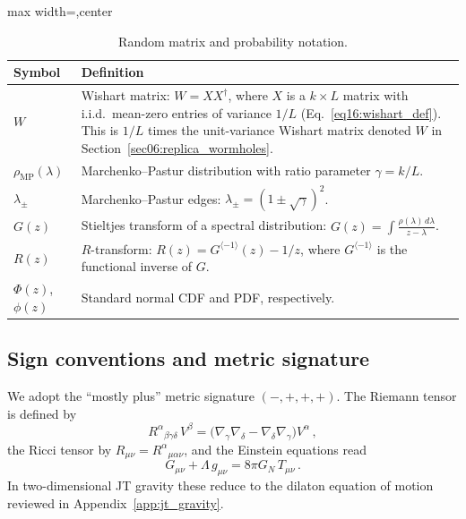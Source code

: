 \documentclass[11pt,letterpaper]{article}
\theoremstyle{plain}
\theoremstyle{definition}
\theoremstyle{remark}
\begin{document}
\begin{table}[ht]
\centering
\renewcommand{\arraystretch}{1.35}
\begin{adjustbox}{max width=\textwidth,center}
\begin{tabular}{@{}lp{10.6cm}@{}}
\hline
\textbf{Symbol} & \textbf{Definition} \\
\hline
$W$ &
  Wishart matrix: $W = X X^{\dagger}$, where $X$ is a $k \times L$ matrix
  with i.i.d.\ mean-zero entries of variance $1/L$
  (Eq.~\eqref{eq16:wishart_def}). This is $1/L$ times the unit-variance
  Wishart matrix denoted $W$ in Section~\ref{sec06:replica_wormholes}. \\
$\rho_{\mathrm{MP}}(\lambda)$ &
  Marchenko--Pastur distribution with ratio parameter $\gamma = k/L$. \\
$\lambda_{\pm}$ &
  Marchenko--Pastur edges: $\lambda_{\pm} = (1 \pm \sqrt{\gamma})^{2}$. \\
$G(z)$ &
  Stieltjes transform of a spectral distribution:
  $G(z) = \int \frac{\rho(\lambda)\,d\lambda}{z - \lambda}$. \\
$R(z)$ &
  $R$-transform: $R(z) = G^{\langle -1\rangle}(z) - 1/z$, where
  $G^{\langle -1\rangle}$ is the functional inverse of $G$. \\
$\Phi(z)$, $\phi(z)$ &
  Standard normal CDF and PDF, respectively. \\
\hline
\end{tabular}
\end{adjustbox}
\caption{Random matrix and probability notation.}
\label{tab16:rmt_notation}
\end{table}

\subsection{Sign conventions and metric signature}

We adopt the ``mostly plus'' metric signature $(-,+,+,+)$.  The Riemann tensor
is defined by
\begin{equation}
  R^{\alpha}{}_{\beta\gamma\delta}\, V^{\beta}
  = \bigl(\nabla_{\gamma}\nabla_{\delta}
  - \nabla_{\delta}\nabla_{\gamma}\bigr) V^{\alpha}\,,
  \label{eq16:riemann_convention}
\end{equation}
the Ricci tensor by $R_{\mu\nu} = R^{\alpha}{}_{\mu\alpha\nu}$, and the
Einstein equations read
\begin{equation}
  G_{\mu\nu} + \Lambda\, g_{\mu\nu} = 8\pi G_N\, T_{\mu\nu}\,.
  \label{eq16:einstein_eq}
\end{equation}
In two-dimensional JT gravity these reduce to the dilaton equation of motion
reviewed in Appendix~\ref{app:jt_gravity}.
\end{document}
